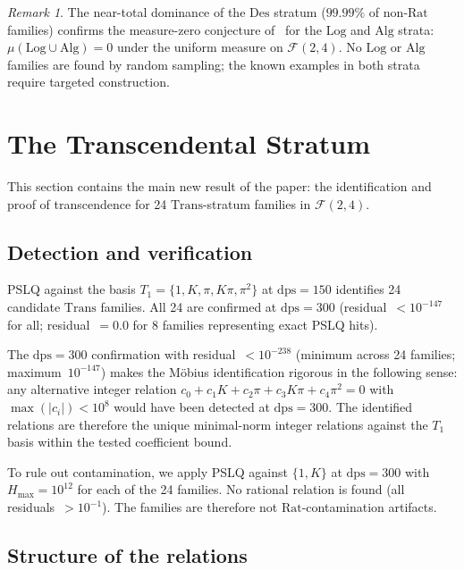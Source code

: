 \documentclass[12pt, reqno]{amsart}
\theoremstyle{definition}
\theoremstyle{remark}
\newtheorem{remark}[theorem]{Remark}
\newcommand{\Rat}{\mathrm{Rat}}
\newcommand{\Log}{\mathrm{Log}}
\newcommand{\Alg}{\mathrm{Alg}}
\newcommand{\Trans}{\mathrm{Trans}}
\newcommand{\Des}{\mathrm{Des}}
\begin{document}
\begin{remark}\label{rem:desertdominance}
The near-total dominance of the $\Des$ stratum ($99.99\%$ of
non-$\Rat$ families) confirms the measure-zero conjecture of~\cite{logladder}
for the $\Log$ and $\Alg$ strata: $\mu(\Log \cup \Alg) = 0$ under the uniform measure on
$\mathcal{F}(2,4)$. No $\Log$ or $\Alg$ families are found by random sampling; the known examples
in both strata require targeted construction.
\end{remark}


\section{The Transcendental Stratum}\label{sec:trans}

This section contains the main new result of the paper: the identification and
proof of transcendence for 24 $\Trans$-stratum families in $\mathcal{F}(2,4)$.

\subsection{Detection and verification}\label{ssec:detection}

PSLQ against the basis $T_1 = \{1, K, \pi, K\pi, \pi^2\}$ at $\mathrm{dps}=150$ identifies 24 candidate
$\Trans$ families. All 24 are confirmed at $\mathrm{dps}=300$ (residual~$< 10^{-147}$ for all;
residual~$= 0.0$ for 8 families representing exact PSLQ hits).

The $\mathrm{dps}=300$ confirmation with residual~$< 10^{-238}$
(minimum across 24 families; maximum~$10^{-147}$) makes
the M\"obius identification rigorous in the following
sense: any alternative integer relation
$c_0 + c_1 K + c_2\pi + c_3 K\pi + c_4\pi^2 = 0$ with
$\max(|c_i|) < 10^8$ would have been detected at $\mathrm{dps}=300$.
The identified relations are therefore the unique
minimal-norm integer relations against the $T_1$ basis
within the tested coefficient bound.

To rule out contamination, we apply PSLQ against $\{1, K\}$ at $\mathrm{dps}=300$ with
$H_{\max}=10^{12}$ for each of the 24 families. No rational relation is found
(all residuals~$> 10^{-1}$). The families are therefore not $\Rat$-contamination artifacts.

\subsection{Structure of the relations}\label{ssec:structure}
\end{document}
